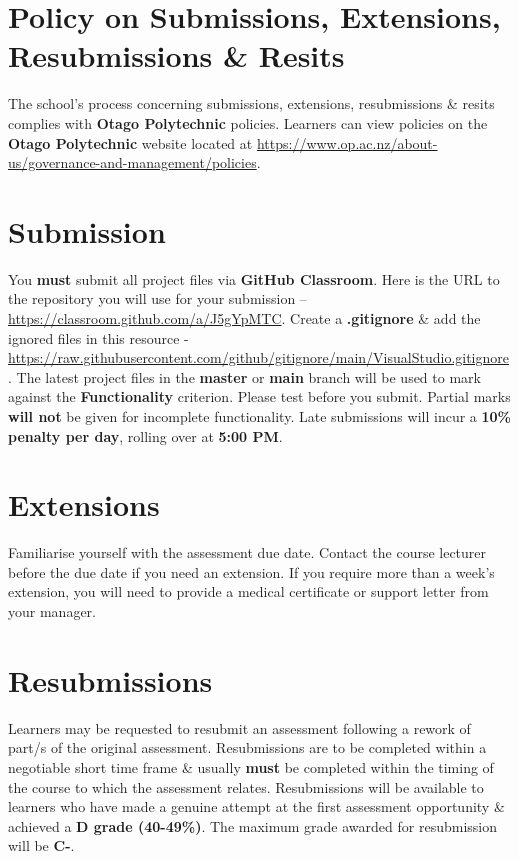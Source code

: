 \documentclass{article}
\begin{document}
\section*{Policy on Submissions, Extensions, Resubmissions \& Resits}
The school's process concerning submissions, extensions, resubmissions \& resits complies with \textbf{Otago Polytechnic} policies. Learners can view policies on the \textbf{Otago Polytechnic} website located at \href{https://www.op.ac.nz/about-us/governance-and-management/policies}{https://www.op.ac.nz/about-us/governance-and-management/policies}.

\section*{Submission}
You \textbf{must} submit all project files via \textbf{GitHub Classroom}. Here is the URL to the repository you will use for your submission – \href{https://classroom.github.com/a/J5gYpMTC}{https://classroom.github.com/a/J5gYpMTC}.  Create a \textbf{.gitignore} \& add the ignored files in this resource - \href{https://raw.githubusercontent.com/github/gitignore/main/VisualStudio.gitignore}{https://raw.githubusercontent.com/github/gitignore/main/VisualStudio.gitignore}. The latest project files in the \textbf{master} or \textbf{main} branch will be used to mark against the \textbf{Functionality} criterion. Please test before you submit. Partial marks \textbf{will not} be given for incomplete functionality. Late submissions will incur a \textbf{10\% penalty per day}, rolling over at \textbf{5:00 PM}.

\section*{Extensions}
Familiarise yourself with the assessment due date. Contact the course lecturer before the due date if you need an extension. If you require more than a week's extension, you will need to provide a medical certificate or support letter from your manager.

\section*{Resubmissions}
Learners may be requested to resubmit an assessment following a rework of part/s of the original assessment. Resubmissions are to be completed within a negotiable short time frame \& usually \textbf{must} be completed within the timing of the course to which the assessment relates. Resubmissions will be available to learners who have made a genuine attempt at the first assessment opportunity \& achieved a \textbf{D grade (40-49\%)}. The maximum grade awarded for resubmission will be \textbf{C-}.
\end{document}
